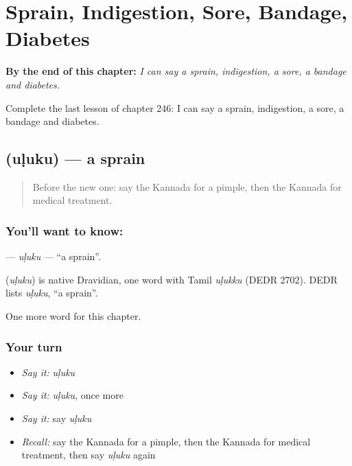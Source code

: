 
\chapter{Sprain, Indigestion, Sore, Bandage, Diabetes}
\label{ch:ka-sprain-indigestion-sore-bandage-diabetes}

\begin{chapteropening}
\textbf{By the end of this chapter:} \emph{I can say a sprain, indigestion, a sore, a bandage and diabetes.}

Complete the last lesson of chapter 246: I can say a sprain, indigestion, a sore, a bandage and diabetes.
\end{chapteropening}

\section[\texorpdfstring{\kn{ಉಳುಕು} (uḷuku)}{ಉಳುಕು (uḷuku)}]{ (uḷuku) — a sprain}

\label{lesson:KA-C246-uluku}



\begin{quote}
Before the new one: say the Kannada for a pimple, then the Kannada for medical treatment.
\end{quote}

\subsection*{You'll want to know: }
\textbf{} — \emph{uḷuku} — \textquotedblleft{}a sprain\textquotedblright{}.

\begin{cousinweb}
\textbf{} (\emph{uḷuku}) is native Dravidian, one word with Tamil \emph{uḷukku} (DEDR 2702). DEDR lists \emph{uḷuku}, \textquotedblleft{}a sprain\textquotedblright{}.
\end{cousinweb}

\begin{grammarlens}[title={What you've built}]
One more word for this chapter.
\end{grammarlens}

\subsection*{Your turn}
\begin{itemize}
\raggedright
  \item \emph{Say it:} \emph{uḷuku}
  \item \emph{Say it:} \emph{uḷuku}, once more
  \item \emph{Say it:} say \emph{uḷuku}
  \item \emph{Recall:} say the Kannada for a pimple, then the Kannada for medical treatment, then say \emph{uḷuku} again
\end{itemize}


